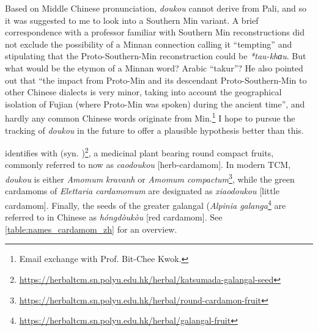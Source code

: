 Based on Middle Chinese pronunciation, \textit{doukou} cannot derive from Pali, and so it was suggested to me to look into a Southern Min variant. 
A brief correspondence with a professor familiar with Southern Min reconstructions did not exclude the possibility of a Minnan connection calling it ``tempting'' and stipulating that the Proto-Southern-Min reconstruction could be \textit{*tau-khɑu}. But what would be the etymon of a Minnan word? Arabic ``takur''? He also pointed out that ``the impact from Proto-Min and its descendant Proto-Southern-Min to other Chinese dialects is very minor, taking into account the geographical isolation of Fujian (where Proto-Min was spoken) during the ancient time'', and hardly any common Chinese words originate from Min.\footnote{Email exchange with Prof. Bit-Chee Kwok.} I hope to pursue the tracking of \textit{doukou} in the future to offer a plausible hypothesis better than this.



\textcite[729]{zhang_dictionary_2015} identifies  with  (syn. )\footnote{\url{https://herbaltcm.sn.polyu.edu.hk/herbal/katsumada-galangal-seed}}, a medicinal plant bearing round compact fruits, commonly referred to now as  \textit{caodoukou} [herb-cardamom]. In modern \gls{TCM}, \textit{doukou} is either \textit{Amomum kravanh} or \textit{Amomum compactum}\footnote{\url{https://herbaltcm.sn.polyu.edu.hk/herbal/round-cardamon-fruit}}, while the green cardamoms of \textit{Elettaria cardamomum} are designated as  \textit{xiaodoukou} [little cardamom]. Finally, the seeds of the greater galangal (\textit{Alpinia galanga}\footnote{\url{https://herbaltcm.sn.polyu.edu.hk/herbal/galangal-fruit}} are referred to in Chinese as 	\textit{hóngdòukòu} [red cardamom]. See \cref{table:names_cardamom_zh} for an overview.






